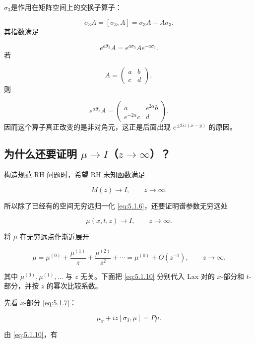 \documentclass[
    lang=cn,
    scheme=chinese,
    mode=simple,
    device=normal,
    color=blue,
    math=cm,
    thmcnt=section,
    12pt
]{elegantbook}
\begin{document}
\begin{callout}
    $\widehat{\sigma}_3$是作用在矩阵空间上的交换子算子：

    \[
        \widehat{\sigma}_3A=[\sigma_3,A]=\sigma_3A-A\sigma_3.
    \]
    其指数满足

    \[
        e^{a\widehat{\sigma}_3}A
        =
        e^{a\sigma_3}Ae^{-a\sigma_3}.
    \]
    若

    \[
        A=\begin{pmatrix}a&b\\c&d\end{pmatrix},
    \]
    则

    \[
        e^{\alpha\widehat{\sigma}_3}A
        =
        \begin{pmatrix}
            a             & e^{2\alpha}b \\
            e^{-2\alpha}c & d
        \end{pmatrix}.
    \]
    因而这个算子真正改变的是非对角元，这正是后面出现 $e^{\pm2iz(x-y)}$ 的原因。
\end{callout}

\subsection{为什么还要证明 \texorpdfstring{$\mu\to I$}{μ → I}（\texorpdfstring{$z\to\infty$}{z → ∞}）？}

构造规范 RH 问题时，希望 RH 未知函数满足

\[
    M(z)\to I,\qquad z\to\infty.
\]

所以除了已经有的空间无穷远归一化 \eqref{eq:5.1.6}，还要证明谱参数无穷远处

\[
    \mu(x,t,z)\to I,\qquad z\to\infty.
\]

将 $\mu$ 在无穷远点作渐近展开

\begin{equation}
    \mu
    =
    \mu^{(0)}
    +\dfrac{\mu^{(1)}}{z}
    +\dfrac{\mu^{(2)}}{z^2}
    +\cdots
    =
    \mu^{(0)}+O(z^{-1}),
    \qquad z\to\infty.
    \tag{5.1.10}
    \label{eq:5.1.10}
\end{equation}

其中 $\mu^{(0)},\mu^{(1)},\ldots$ 与 $z$ 无关。下面把 \eqref{eq:5.1.10} 分别代入 Lax 对的 $x$-部分和 $t$-部分，并按 $z$ 的幂次比较系数。

先看 $x$-部分 \eqref{eq:5.1.7}：

\[
    \mu_x+iz[\sigma_3,\mu]=P\mu.
\]

由 \eqref{eq:5.1.10}，有
\end{document}
